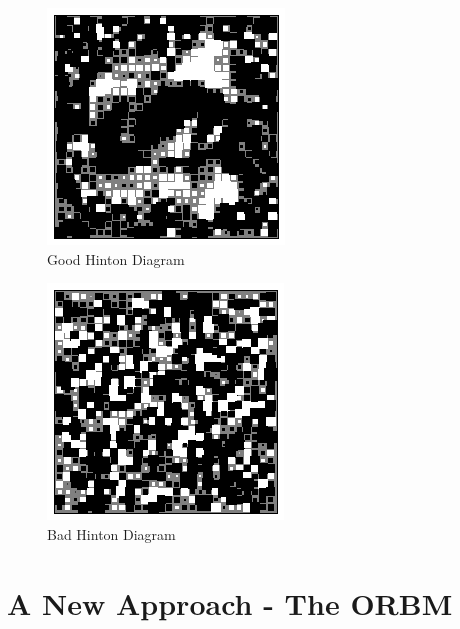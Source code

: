   \begin{figure}[]
  \begin{center}
  	\includegraphics[]{Assets/HINTON1}
  \caption{ Good Hinton Diagram}
  \label{F:TEMP}
  \end{center}
  \end{figure}
  \begin{figure}[]
  \begin{center}
    \includegraphics[]{Assets/HINTON2}
  \caption{Bad Hinton Diagram}
  \label{F:TEMP}
  \end{center}
  \end{figure}


  \section{A New Approach - The ORBM}

